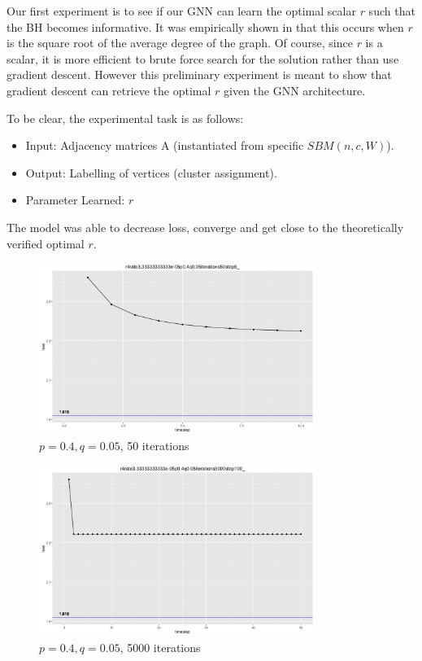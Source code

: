 Our first experiment is to see if our GNN can learn the optimal scalar $r$ such that the BH becomes informative.  It was empirically shown in \cite{AFL} that this occurs when $r$ is the square root of the average degree of the graph.  Of course, since $r$ is a scalar, it is more efficient to brute force search for the solution rather than use gradient descent. However this preliminary experiment is meant to show that gradient descent can retrieve the optimal $r$ given the GNN architecture.  

To be clear, the experimental task is as follows:

\begin{itemize}
    \item Input: Adjacency matrices A (instantiated from specific $SBM(n,c,W)$). 
    \item Output: Labelling of vertices (cluster assignment). 
    \item Parameter Learned: $r$
\end{itemize}

The model was able to decrease loss, converge and get close to the theoretically verified optimal $r$. 

\begin{figure}
\begin{center}
  \includegraphics[width=0.8\textwidth]{50steps.png}
   \caption{$p=0.4, q=0.05$, 50 iterations}
  \label{fig:GNN_BH}
 \end{center}
\end{figure}

\begin{figure}
\begin{center}
  \includegraphics[width=0.8\textwidth]{500steps.png}
   \caption{$p=0.4, q=0.05$, 5000 iterations}
  \label{fig:GNN_BH_1}
 \end{center}
\end{figure}

